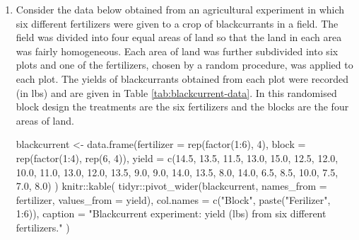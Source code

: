 \documentclass[
]{book}
\newenvironment{Shaded}{\begin{snugshade}}{\end{snugshade}}
\newcommand{\AttributeTok}[1]{\textcolor[rgb]{0.77,0.63,0.00}{#1}}
\newcommand{\DecValTok}[1]{\textcolor[rgb]{0.00,0.00,0.81}{#1}}
\newcommand{\FloatTok}[1]{\textcolor[rgb]{0.00,0.00,0.81}{#1}}
\newcommand{\FunctionTok}[1]{\textcolor[rgb]{0.00,0.00,0.00}{#1}}
\newcommand{\NormalTok}[1]{#1}
\newcommand{\OtherTok}[1]{\textcolor[rgb]{0.56,0.35,0.01}{#1}}
\newcommand{\SpecialCharTok}[1]{\textcolor[rgb]{0.00,0.00,0.00}{#1}}
\newcommand{\StringTok}[1]{\textcolor[rgb]{0.31,0.60,0.02}{#1}}
\theoremstyle{definition}
\theoremstyle{definition}
\theoremstyle{definition}
\theoremstyle{definition}
\theoremstyle{remark}
\begin{document}
\begin{enumerate}
\def\labelenumi{\arabic{enumi}.}
\setcounter{enumi}{1}
\item
  Consider the data below obtained from an agricultural experiment in which six different fertilizers were given to a crop of blackcurrants in a field. The field was divided into four equal areas of land so that the land in each area was fairly homogeneous. Each area of land was further subdivided into six plots and one of the fertilizers, chosen by a random procedure, was applied to each plot. The yields of blackcurrants obtained from each plot were recorded (in lbs) and are given in Table \ref{tab:blackcurrent-data}. In this randomised block design the treatments are the six fertilizers and the blocks are the four areas of land.

\begin{Shaded}
\begin{Highlighting}[]
\NormalTok{blackcurrent }\OtherTok{\textless{}{-}} \FunctionTok{data.frame}\NormalTok{(}\AttributeTok{fertilizer =} \FunctionTok{rep}\NormalTok{(}\FunctionTok{factor}\NormalTok{(}\DecValTok{1}\SpecialCharTok{:}\DecValTok{6}\NormalTok{), }\DecValTok{4}\NormalTok{),}
               \AttributeTok{block =} \FunctionTok{rep}\NormalTok{(}\FunctionTok{factor}\NormalTok{(}\DecValTok{1}\SpecialCharTok{:}\DecValTok{4}\NormalTok{), }\FunctionTok{rep}\NormalTok{(}\DecValTok{6}\NormalTok{, }\DecValTok{4}\NormalTok{)), }
               \AttributeTok{yield =} \FunctionTok{c}\NormalTok{(}\FloatTok{14.5}\NormalTok{, }\FloatTok{13.5}\NormalTok{, }\FloatTok{11.5}\NormalTok{, }\FloatTok{13.0}\NormalTok{, }\FloatTok{15.0}\NormalTok{, }\FloatTok{12.5}\NormalTok{,}
                            \FloatTok{12.0}\NormalTok{, }\FloatTok{10.0}\NormalTok{, }\FloatTok{11.0}\NormalTok{, }\FloatTok{13.0}\NormalTok{, }\FloatTok{12.0}\NormalTok{, }\FloatTok{13.5}\NormalTok{,}
                            \FloatTok{9.0}\NormalTok{, }\FloatTok{9.0}\NormalTok{, }\FloatTok{14.0}\NormalTok{, }\FloatTok{13.5}\NormalTok{, }\FloatTok{8.0}\NormalTok{, }\FloatTok{14.0}\NormalTok{,}
                            \FloatTok{6.5}\NormalTok{, }\FloatTok{8.5}\NormalTok{, }\FloatTok{10.0}\NormalTok{, }\FloatTok{7.5}\NormalTok{, }\FloatTok{7.0}\NormalTok{, }\FloatTok{8.0}\NormalTok{)}
\NormalTok{)}
\NormalTok{knitr}\SpecialCharTok{::}\FunctionTok{kable}\NormalTok{(}
\NormalTok{ tidyr}\SpecialCharTok{::}\FunctionTok{pivot\_wider}\NormalTok{(blackcurrent, }\AttributeTok{names\_from =}\NormalTok{ fertilizer, }\AttributeTok{values\_from =}\NormalTok{ yield),}
 \AttributeTok{col.names =} \FunctionTok{c}\NormalTok{(}\StringTok{"Block"}\NormalTok{, }\FunctionTok{paste}\NormalTok{(}\StringTok{"Ferilizer"}\NormalTok{, }\DecValTok{1}\SpecialCharTok{:}\DecValTok{6}\NormalTok{)),}
 \AttributeTok{caption =} \StringTok{"Blackcurrent experiment: yield (lbs) from six different fertilizers."}
\NormalTok{)}
\end{Highlighting}
\end{Shaded}


\end{enumerate}
\end{document}
